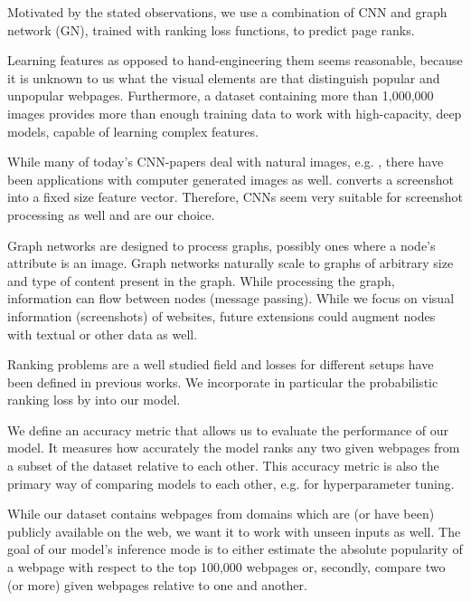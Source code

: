 Motivated by the stated observations, we use a combination of CNN and graph network (GN), trained with ranking loss functions, to predict page ranks.

Learning features as opposed to hand-engineering them seems reasonable, because it is unknown to us what the visual elements are that distinguish popular and unpopular webpages. Furthermore, a dataset containing more than 1,000,000 images provides more than enough training data to work with high-capacity, deep models, capable of learning complex features.

While many of today's CNN-papers deal with natural images, e.g. \cite{gu2018ava,szegedy2017inception,openai:learningdexterity}, there have been applications with computer generated images as well. \cite{beltramelli:pix2code} converts a screenshot into a fixed size feature vector. Therefore, CNNs seem very suitable for screenshot processing as well and are our choice.

Graph networks are designed to process graphs, possibly ones where a node's attribute is an image. Graph networks naturally scale to graphs of arbitrary size and type of content present in the graph. While processing the graph, information can flow between nodes (message passing). While we focus on visual information (screenshots) of websites, future extensions could augment nodes with textual or other data as well.

Ranking problems are a well studied field and losses for different setups have been defined in previous works. We incorporate in particular the probabilistic ranking loss by \cite{Burges:learningtorankwithsgd} into our model.

We define an accuracy metric that allows us to evaluate the performance of our model. It measures how accurately the model ranks any two given webpages from a subset of the dataset relative to each other. This accuracy metric is also the primary way of comparing models to each other, e.g. for hyperparameter tuning.

While our dataset contains webpages from domains which are (or have been) publicly available on the web, we want it to work with unseen inputs as well. The goal of our model's inference mode is to either estimate the absolute popularity of a webpage with respect to the top 100,000 webpages or, secondly, compare two (or more) given webpages relative to one and another.

